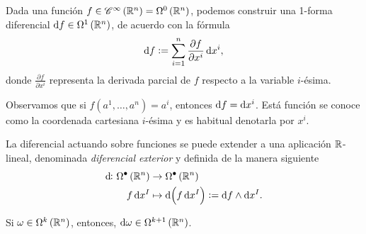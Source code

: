 \begin{defi}
   Dada una función $f \in \mathscr{C}^\infty \left( \mathbb{R}^n \right) = \Omega^0 \left( \mathbb{R}^n \right)$, podemos construir una 1-forma diferencial
   $\dif f \in \Omega^1 \left( \real^n \right)$, de acuerdo con la fórmula
   \[
       \dif f := \sum^n_{i=1} \frac{\partial f}{\partial x^i} \dif x^i,
   \]
   donde $\frac{\partial f}{\partial x^i}$ representa la derivada parcial de $f$ respecto a la variable $i$-\'esima.
\end{defi}

\begin{obs}
    Observamos que si $f \left( a^1, \dots, a^n \right) = a^i$, entonces $\dif f = \dif x^i$. Está función se conoce como la coordenada
    cartesiana $i$-\'esima y es habitual denotarla por $x^i$.
\end{obs}

\begin{defi}
    La diferencial actuando sobre funciones se puede extender a una aplicación $\mathbb{R}$-lineal, denominada \emph{diferencial exterior} y definida
    de la manera siguiente
        \begin{align*}
            \dif \colon \Omega^\bullet \left( \real^n \right) &\to \Omega^\bullet \left( \real^n \right) \\
            f \dif x^I &\mapsto \dif\left( f \dif x^I \right) := \dif f \wedge \dif x^I.
        \end{align*}
\end{defi}

\begin{obs}
    Si $\omega \in \Omega^k \left( \mathbb{R}^n \right)$, entonces, $\dif \omega \in \Omega^{k+1} \left( \real^n \right)$.
\end{obs}

